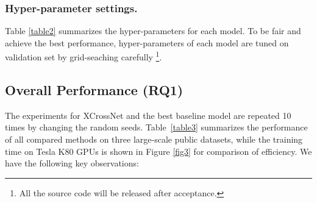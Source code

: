 \documentclass[letterpaper]{article} \usepackage{aaai21}  \usepackage{times}  \usepackage{helvet} \usepackage{courier}  \usepackage[hyphens]{url}  \usepackage{graphicx} \urlstyle{rm} \def\UrlFont{\rm}  \usepackage{natbib}  \usepackage{caption} \frenchspacing  \setlength{\pdfpagewidth}{8.5in}  \setlength{\pdfpageheight}{11in}  \usepackage{graphicx}
\begin{document}
\vspace{-0.1cm}
\subsubsection{Hyper-parameter settings.} Table \ref{table2} summarizes the hyper-parameters for each model. To be fair and achieve the best performance, hyper-parameters of each model are tuned on validation set by grid-seaching carefully \footnote{All the source code will be released after acceptance.}.

\vspace{-0.1cm}
\subsection{Overall Performance (RQ1)}
The experiments for XCrossNet and the best baseline model are repeated 10 times by changing the random seeds. Table~\ref{table3} summarizes the performance of all compared methods on three large-scale public datasets, while the training time on Tesla K80 GPUs is shown in Figure \ref{fig3} for comparison of efficiency. We have the following key observations:
\end{document}

